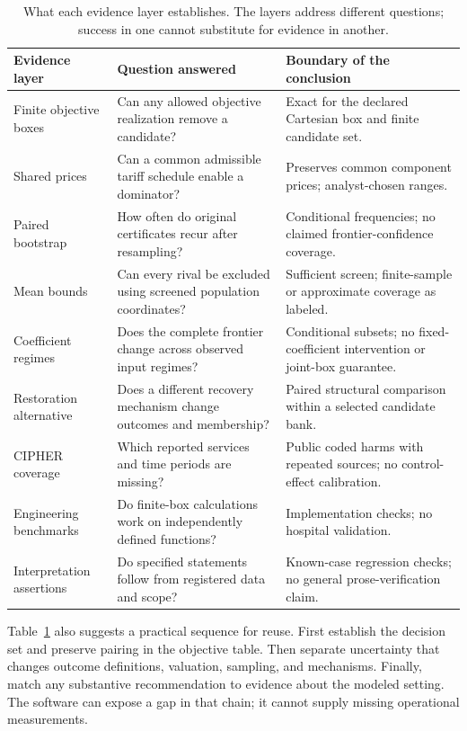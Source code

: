 \begin{table}[t]
\centering\small
\caption{What each evidence layer establishes. The layers address different
questions; success in one cannot substitute for evidence in another.}
\label{tab:evidence-scope}
\begin{tabularx}{\textwidth}{@{}lXX@{}}\toprule
Evidence layer & Question answered & Boundary of the conclusion\\\midrule
Finite objective boxes & Can any allowed objective realization remove a candidate? & Exact for the declared Cartesian box and finite candidate set.\\
Shared prices & Can a common admissible tariff schedule enable a dominator? & Preserves common component prices; analyst-chosen ranges.\\
Paired bootstrap & How often do original certificates recur after resampling? & Conditional frequencies; no claimed frontier-confidence coverage.\\
Mean bounds & Can every rival be excluded using screened population coordinates? & Sufficient screen; finite-sample or approximate coverage as labeled.\\
Coefficient regimes & Does the complete frontier change across observed input regimes? & Conditional subsets; no fixed-coefficient intervention or joint-box guarantee.\\
Restoration alternative & Does a different recovery mechanism change outcomes and membership? & Paired structural comparison within a selected candidate bank.\\
CIPHER coverage & Which reported services and time periods are missing? & Public coded harms with repeated sources; no control-effect calibration.\\
Engineering benchmarks & Do finite-box calculations work on independently defined functions? & Implementation checks; no hospital validation.\\
Interpretation assertions & Do specified statements follow from registered data and scope? & Known-case regression checks; no general prose-verification claim.\\\bottomrule
\end{tabularx}
\end{table}
Table~\ref{tab:evidence-scope} also suggests a practical sequence for reuse.
First establish the decision set and preserve pairing in the objective table.
Then separate uncertainty that changes outcome definitions, valuation, sampling,
and mechanisms. Finally, match any substantive recommendation to evidence
about the modeled setting. The software can expose a gap in that chain;
it cannot supply missing operational measurements.
